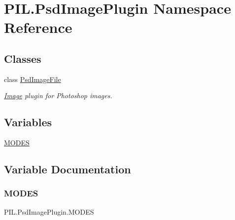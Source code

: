 \hypertarget{namespacePIL_1_1PsdImagePlugin}{}\section{P\+I\+L.\+Psd\+Image\+Plugin Namespace Reference}
\label{namespacePIL_1_1PsdImagePlugin}
\subsection*{Classes}
\begin{DoxyCompactItemize}
\item 
class \hyperlink{classPIL_1_1PsdImagePlugin_1_1PsdImageFile}{Psd\+Image\+File}
\begin{DoxyCompactList}\small\item\em \hyperlink{namespacePIL_1_1Image}{Image} plugin for Photoshop images. \end{DoxyCompactList}\end{DoxyCompactItemize}
\subsection*{Variables}
\begin{DoxyCompactItemize}
\item 
\hyperlink{namespacePIL_1_1PsdImagePlugin_ac7d6cf4291a4104fabe22bd6c17f29a1}{M\+O\+D\+ES}
\end{DoxyCompactItemize}


\subsection{Variable Documentation}
\mbox{\label{namespacePIL_1_1PsdImagePlugin_ac7d6cf4291a4104fabe22bd6c17f29a1}} 
\subsubsection{\texorpdfstring{M\+O\+D\+ES}{MODES}}
{\footnotesize\ttfamily P\+I\+L.\+Psd\+Image\+Plugin.\+M\+O\+D\+ES}

